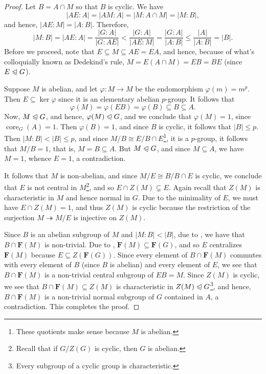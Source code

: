 \documentclass[12pt]{article}
\theoremstyle{thmstyle}
\theoremstyle{defstyle}
\newcommand{\onto}{\twoheadrightarrow}
\renewcommand{\le}{\leqslant}
\newcommand{\bfF}{\mathbf{F}} %
\newcommand{\noreq}{\trianglelefteqslant}
\newcommand{\core}{\operatorname{core}}
\begin{document}
\begin{proof}
    Let $B = A\cap M$ so that $B$ is cyclic. We have 
    \begin{equation*}
        |AE : A| = |AM : A| = |M : A\cap M| = |M : B|,
    \end{equation*}
    and hence, $|AE : M| = |A : B|$. Therefore, 
    \begin{equation*}
        |M : B| = |AE : A| = \frac{|G : A|}{|G : AE|} < \frac{|G : A|}{|AE : M|} = \frac{|G : A|}{|A : B|}\le\frac{|A|}{|A : B|} = |B|.
    \end{equation*}
    Before we proceed, note that $E\subseteq M\subseteq AE = EA$, and hence, because of what's colloquially known as Dedekind's rule, $M = E(A\cap M) = EB = BE$ (since $E\noreq G$).

    Suppose $M$ is abelian, and let $\varphi: M\to M$ be the endomorphism $\varphi(m) = m^p$. Then $E\subseteq\ker\varphi$ since it is an elementary abelian $p$-group. It follows that 
    \begin{equation*}
        \varphi(M) = \varphi(EB) = \varphi(B)\subseteq B\subseteq A.
    \end{equation*}
    Now, $M\noreq G$, and hence, $\varphi(M)\noreq G$, and we conclude that $\varphi(M) = 1$, since $\core_G(A) = 1$. Then $\varphi(B) = 1$, and since $B$ is cyclic, it follows that $|B|\le p$. Then $|M : B| < |B|\le p$, and since $M/B\cong E/B\cap E$\footnote{These quotients make sense because $M$ is abelian.}, it is a $p$-group, it follows that $M/B = 1$, that is, $M = B\subseteq A$. But $M\noreq G$, and since $M\subseteq A$, we have $M = 1$, whence $E = 1$, a contradiction.

    It follows that $M$ is non-abelian, and since $M/E\cong B/B\cap E$ is cyclic, we conclude that $E$ is not central in $M$\footnote{Recall that if $G/Z(G)$ is cyclic, then $G$ is abelian.}, and so $E\cap Z(M)\subsetneq E$. Again recall that $Z(M)$ is characteristic in $M$ and hence normal in $G$. Due to the minimality of $E$, we must have $E\cap Z(M) = 1$, and thus $Z(M)$ is cyclic because the restriction of the surjection $M\onto M/E$ is injective on $Z(M)$.

    Since $B$ is an abelian subgroup of $M$ and $|M : B| < |B|$, due to , we have that $B\cap\bfF(M)$ is non-trivial. Due to , $\bfF(M)\subseteq\bfF(G)$, and so $E$ centralizes $\bfF(M)$ because $E\subseteq Z(\bfF(G))$. Since every element of $B\cap \bfF(M)$ commutes with every element of $B$ (since $B$ is abelian) and every element of $E$, we see that $B\cap \bfF(M)$ is a non-trivial central subgroup of $EB = M$. Since $Z(M)$ is cyclic, we see that $B\cap\bfF(M)\subseteq Z(M)$ is characteristic in $Z(M)\noreq G$\footnote{Every subgroup of a cyclic group is characteristic.}, and hence, $B\cap\bfF(M)$ is a non-trivial normal subgroup of $G$ contained in $A$, a contradiction. This completes the proof.
\end{proof}
\end{document}
